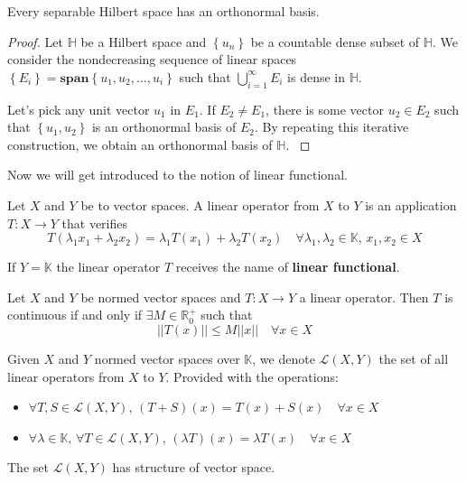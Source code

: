 \begin{teorema}
    Every separable Hilbert space has an orthonormal basis.
\end{teorema}
\begin{proof}
    Let $\mathbb{H}$ be a Hilbert space and $\left\lbrace u_n \right\rbrace$ be a countable dense subset of $\mathbb{H}$. We consider the nondecreasing sequence of linear spaces $\left\lbrace E_i \right\rbrace = \textbf{span}\left\lbrace u_1, u_2, ..., u_i\right\rbrace$ such that $ \bigcup_{i=1}^{\infty} E_i$ is dense in $\mathbb{H}$. 

    Let's pick any unit vector $u_1$ in $E_1$. If $E_2 \neq E_1$, there is some vector $u_2 \in E_2$ such that $\left\lbrace u_1, u_2 \right\rbrace$ is an orthonormal basis of $E_2$. By repeating this iterative construction, we obtain an orthonormal basis of $\mathbb{H}$. \cite{brezis2011functional}
\end{proof}

Now we will get introduced to the notion of linear functional.

\begin{definicion}
    Let $X$ and $Y$ be to vector spaces. A linear operator from $X$ to $Y$ is an application $T: X \longrightarrow Y$ that verifies
    $$T(\lambda_1 x_1 + \lambda_2 x_2) = \lambda_1 T(x_1) + \lambda_2 T(x_2) \quad \forall \lambda_1, \lambda_2 \in \mathbb{K},\,x_1, x_2 \in X$$

    If $Y = \mathbb{K}$ the linear operator $T$ receives the name of \textbf{linear functional}.
\end{definicion}

\begin{proposicion}
    Let $X$ and $Y$ be normed vector spaces and $T: X \longrightarrow Y$  a linear operator. Then $T$ is continuous if and only if $\exists M \in \mathbb{R}_0^{+}$  such that $$||T(x)|| \leq M ||x|| \quad \forall x \in X$$
\end{proposicion}

\begin{definicion} 
    Given $X$ and $Y$ normed vector spaces over $\mathbb{K}$, we denote $\mathcal{L}(X,Y)$ the set of all linear operators from $X$ to $Y$. Provided with the operations:
    \begin{itemize}
        \item $\forall T,S \in \mathcal{L}(X,Y), \, (T+S)(x) = T(x) + S(x) \quad \forall x \in X$
        \item $\forall \lambda \in \mathbb{K},\,\forall T \in \mathcal{L}(X,Y), \, (\lambda T)(x) = \lambda T(x) \quad \forall x \in X$
    \end{itemize}
    The set $\mathcal{L}(X,Y)$ has structure of vector space. 
\end{definicion}

